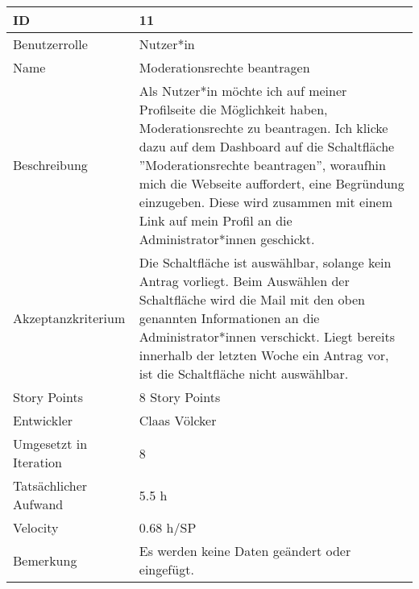 \begin{tabularx}{\textwidth}{|p{}|X|}
	\hline
	ID & 11\\
	\hline
	Benutzerrolle & Nutzer*in\\
	\hline
	Name & Moderationsrechte beantragen\\
	\hline
	Beschreibung & Als Nutzer*in möchte ich auf meiner Profilseite die Möglichkeit haben, Moderationsrechte zu beantragen. Ich klicke dazu auf dem Dashboard auf die Schaltfläche ''Moderationsrechte beantragen'', woraufhin mich die Webseite auffordert, eine Begründung einzugeben. Diese wird zusammen mit einem Link auf mein Profil an die Administrator*innen geschickt.\\
	\hline
	Akzeptanzkriterium & Die Schaltfläche ist auswählbar, solange kein Antrag vorliegt. Beim Auswählen der Schaltfläche wird die Mail mit den oben genannten Informationen an die Administrator*innen verschickt. Liegt bereits innerhalb der letzten Woche ein Antrag vor, ist die Schaltfläche nicht auswählbar.\\
	\hline
	Story Points & 8 Story Points\\
	\hline
	Entwickler & Claas Völcker\\
	\hline
	Umgesetzt in Iteration & 8\\
	\hline
	Tatsächlicher Aufwand & 5.5 h\\
	\hline
	Velocity & 0.68 h/SP\\
	\hline
	Bemerkung & Es werden keine Daten geändert oder eingefügt.\\
	\hline
\end{tabularx}
\vspace{20pt}

